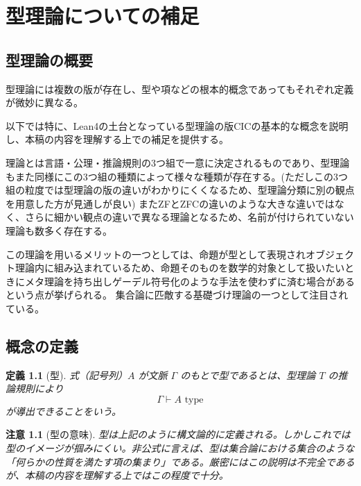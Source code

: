 \documentclass[a4paper,12pt]{bxjsbook}
\newlength{\customindent}
\newenvironment{body}{
  \par
  \begingroup
  \setlength{\leftskip}{\customindent}
  \setlength{\rightskip}{0pt}
  \setlength{\parindent}{1em}
  \setlength{\displayindent}{\customindent}
  \setlength{\displaywidth}{\dimexpr\linewidth-\customindent\relax}
}{
  \par
  \endgroup
}
\theoremstyle{theorem}
\newtheorem{definition}[theorem]{定義}
\newtheorem{remark}[theorem]{注意}
\begin{document}
\begin{body}
    \appendix

    \chapter{型理論についての補足}

    \section{型理論の概要}


    \begin{body}
        \indent 型理論には複数の版が存在し、型や項などの根本的概念であってもそれぞれ定義が微妙に異なる。

        \indent 以下では特に、Lean4の土台となっている型理論の版CICの基本的な概念を説明し、本稿の内容を理解する上での補足を提供する。

        \indent 理論とは言語・公理・推論規則の3つ組で一意に決定されるものであり、型理論もまた同様にこの3つ組の種類によって様々な種類が存在する。(ただしこの3つ組の粒度では型理論の版の違いがわかりにくくなるため、型理論分類に別の観点を用意した方が見通しが良い)
        またZFとZFCの違いのような大きな違いではなく、さらに細かい観点の違いで異なる理論となるため、名前が付けられていない理論も数多く存在する。

        \indent この理論を用いるメリットの一つとしては、命題が型として表現されオブジェクト理論内に組み込まれているため、命題そのものを数学的対象として扱いたいときにメタ理論を持ち出しゲーデル符号化のような手法を使わずに済む場合があるという点が挙げられる。
        集合論に匹敵する基礎づけ理論の一つとして注目されている。

    \end{body}
    \section{概念の定義}
    \begin{definition}[型]
        式（記号列）$A$ が文脈 $\Gamma$ のもとで型であるとは、型理論 $T$ の推論規則により
        \[
        \Gamma \vdash A \text{ type}
        \]
        が導出できることをいう。
    \end{definition}

    \begin{remark}[型の意味]
        型は上記のように構文論的に定義される。しかしこれでは型のイメージが掴みにくい。非公式に言えば、型は集合論における集合のような「何らかの性質を満たす項の集まり」である。厳密にはこの説明は不完全であるが、本稿の内容を理解する上ではこの程度で十分。
    \end{remark}


\end{body}
\end{document}
